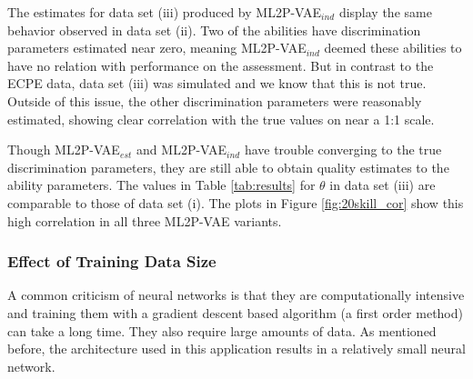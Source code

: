 The estimates for data set (iii) produced by ML2P-VAE$_{ind}$ display the same behavior observed in data set (ii). Two of the abilities have discrimination parameters estimated near zero, meaning ML2P-VAE$_{ind}$ deemed these abilities to have no relation with performance on the assessment. But in contrast to the ECPE data, data set (iii) was simulated and we know that this is not true. Outside of this issue, the other discrimination parameters were reasonably estimated, showing clear correlation with the true values on near a 1:1 scale.


Though ML2P-VAE$_{est}$ and ML2P-VAE$_{ind}$ have trouble converging to the true discrimination parameters, they are still able to obtain quality estimates to the ability parameters. The values in Table \ref{tab:results} for $\theta$ in data set (iii) are comparable to those of data set (i). The plots in Figure \ref{fig:20skill_cor} show this high correlation in all three ML2P-VAE variants.

\subsubsection{Effect of Training Data Size}
A common criticism of neural networks is that they are computationally intensive and training them with a gradient descent based algorithm (a first order method) can take a long time. They also require large amounts of data. As mentioned before, the architecture used in this application results in a relatively small neural network.

